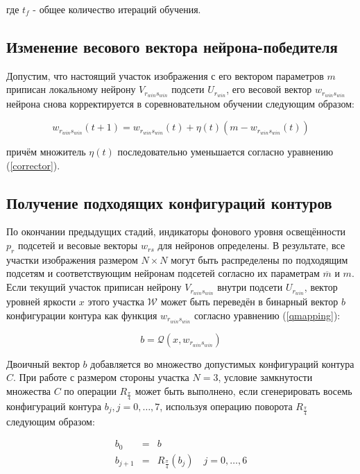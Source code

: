\documentclass[a4paper,12pt]{report}
\begin{document}
где $t_f$ - общее количество итераций обучения.

\subsection{Изменение весового вектора нейрона-победителя}
 
Допустим, что настоящий участок изображения с его вектором параметров $m$ приписан локальному нейрону $V_ {r_{win} s_{win}}$ подсети $U_{r_{win}}$, его весовой вектор $w_{r_{win} s_{win}}$ нейрона снова корректируется в соревновательном обучении следующим образом:

\begin{equation}
w_{r_{win} s_{win}}(t+1)= w_{r_{win} s_{win}}(t)+\eta(t)(m-w_{r_{win} s_{win}}(t))
\label{weightcorrection}
\end{equation}

причём множитель $\eta(t)$ последовательно уменьшается согласно уравнению (\ref{corrector}).
 
\subsection{Получение подходящих конфигураций контуров}

По окончании предыдущих стадий, индикаторы фонового уровня освещённости $p_r$ подсетей и весовые векторы $w_{rs}$ для нейронов определены. В результате, все участки изображения размером $N\times N$ могут быть распределены по подходящим подсетям и соответствующим нейронам подсетей согласно их параметрам $\overline{m}$ и $m$. Если текущий участок  приписан нейрону $V_{r_{win} s_{win}}$ внутри подсети $U_{r_{win}}$, вектор уровней яркости $x$ этого участка $\mathcal{W}$ может быть переведён в бинарный вектор $b$ конфигурации контура как функция $w_{r_{win} s_{win}}$ согласно уравнению (\ref{qmapping}):

\begin{equation}
b=\mathcal{Q}(x,w_{r_{win} s_{win}})
\end{equation}

Двоичный вектор $b$ добавляется во множество допустимых конфигураций контура $C$. При работе с размером стороны участка $N=3$, условие замкнутости множества $C$ по операции $R_{\frac{\pi}{4}}$ может быть выполнено, если сгенерировать восемь конфигураций контура $b_j,j=0,\dots,7$, используя  операцию поворота $R_{\frac{\pi}{4}}$ следующим образом:

\begin{eqnarray}
b_0 & = & b \\
b_{j+1} & = & R_{\frac{\pi}{4}}(b_j)\quad j=0,\dots,6
\end{eqnarray}
 
\end{document}
